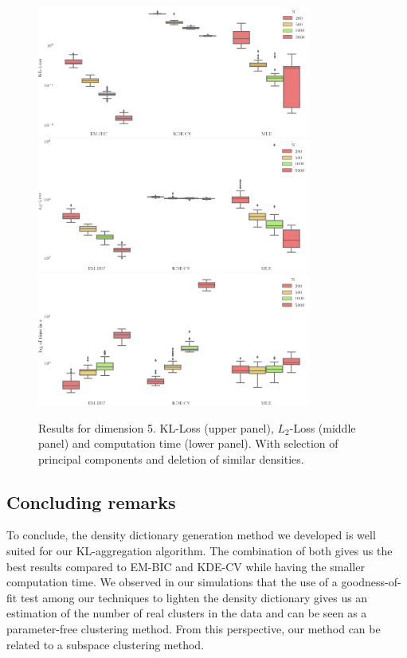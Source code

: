\begin{figure}
\center
    \includegraphics[width=0.8\textwidth]{./TeX_files/dict_gen_loss_dim_5_KL_gof_pc_select.png}
    \includegraphics[width=0.8\textwidth]{./TeX_files/dict_gen_loss_dim_5_L2_gof_pc_select.png}
    \includegraphics[width=0.8\textwidth]{./TeX_files/dict_gen_time_dim_5_gof_pc_select.png}
    \caption{Results for dimension 5. KL-Loss (upper panel), $L_2$-Loss (middle panel) and computation time (lower panel). With selection of principal components and deletion of similar densities.}
    \label{fig:result_dict_gen_dim_5_gof_pc_select}
\end{figure}
\subsection{Concluding remarks}
To conclude, the density dictionary generation method we developed is well suited for our KL-aggregation algorithm. The combination of both gives us the best results compared to EM-BIC and KDE-CV while having the smaller computation time. We observed in our simulations that the use of a goodness-of-fit test among our techniques to lighten the density dictionary gives us an estimation of the number of real clusters in the data and can be seen as a parameter-free clustering method. From this perspective, our method can be related to a subspace clustering method.